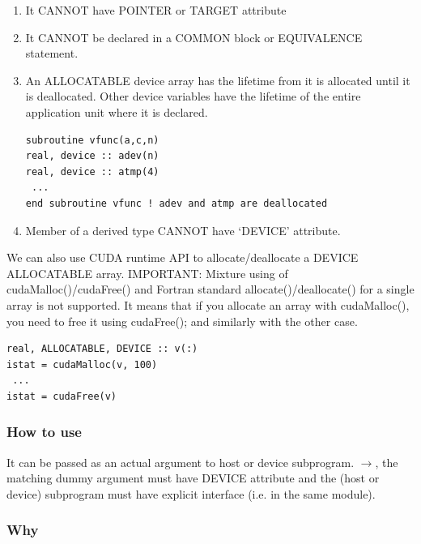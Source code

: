 \begin{enumerate}
\item It CANNOT have POINTER or TARGET attribute

\item It CANNOT be declared in a COMMON block or EQUIVALENCE
  statement.

\item An ALLOCATABLE device array has the lifetime from it is
  allocated until it is deallocated. Other device variables have the
  lifetime of the entire application unit where it is declared.
\begin{lstlisting}
subroutine vfunc(a,c,n)
real, device :: adev(n)
real, device :: atmp(4) 
 ...
end subroutine vfunc ! adev and atmp are deallocated
\end{lstlisting}

\item Member of a derived type CANNOT have `DEVICE' attribute.

\end{enumerate}

We can also use CUDA runtime API to allocate/deallocate a DEVICE
ALLOCATABLE array. IMPORTANT: Mixture using of cudaMalloc()/cudaFree()
and Fortran standard allocate()/deallocate() for a single array is not
supported. It means that if you allocate an array with cudaMalloc(),
you need to free it using cudaFree(); and similarly with the other
case.

\begin{lstlisting}
real, ALLOCATABLE, DEVICE :: v(:)
istat = cudaMalloc(v, 100)
 ...
istat = cudaFree(v)
\end{lstlisting}

\subsubsection{How to use}
\label{sec:how-use-1}

It can be passed as an actual argument to host or device
subprogram. $\rightarrow$, the matching dummy argument must have
DEVICE attribute and the (host or device) subprogram must have
explicit interface (i.e. in the same module).

\subsubsection{Why}
\label{sec:why-1}

